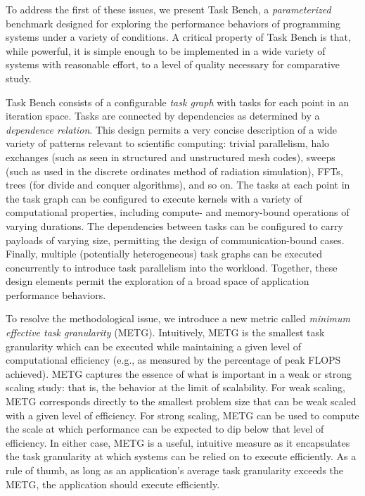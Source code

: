 To address the first of these issues, we present Task Bench, a
\emph{parameterized} benchmark designed for exploring the performance
behaviors of programming systems under a variety of conditions. A
critical property of Task Bench is that, while powerful, it is simple
enough to be implemented in a wide variety of systems with reasonable
effort, to a level of quality necessary for comparative study.

Task Bench consists of a configurable \emph{task graph} with tasks for
each point in an iteration space. Tasks are connected by dependencies
as determined by a \emph{dependence relation}. This design permits a
very concise description of a wide variety of patterns relevant to
scientific computing: trivial parallelism, halo exchanges (such as
seen in structured and unstructured mesh codes), sweeps (such as used
in the discrete ordinates method of radiation simulation), FFTs, trees
(for divide and conquer algorithms), and so on. The tasks at each
point in the task graph can be configured to execute kernels with a
variety of computational properties, including compute- and
memory-bound operations of varying durations. The dependencies between
tasks can be configured to carry payloads of varying size, permitting
the design of communication-bound cases. Finally, multiple
(potentially heterogeneous) task graphs can be executed concurrently
to introduce task parallelism into the workload. Together, these
design elements permit the exploration of a broad space of application
performance behaviors.

To resolve the methodological issue, we introduce a new metric called
\emph{minimum effective task granularity} (METG). Intuitively, METG is
the smallest task granularity which can be executed while maintaining
a given level of computational efficiency (e.g., as measured by the
percentage of peak FLOPS achieved). METG captures the essence of what
is important in a weak or strong scaling study: that is, the behavior
at the limit of scalability. For weak scaling, METG corresponds
directly to the smallest problem size that can be weak scaled with a
given level of efficiency. For strong scaling, METG can be used to
compute the scale at which performance can be expected to dip below
that level of efficiency. In either case, METG is a useful, intuitive
measure as it
encapsulates the task granularity at which systems can be relied on to
execute efficiently. As a rule of thumb, as long as an application's
average task granularity exceeds the METG, the application should
execute efficiently.

